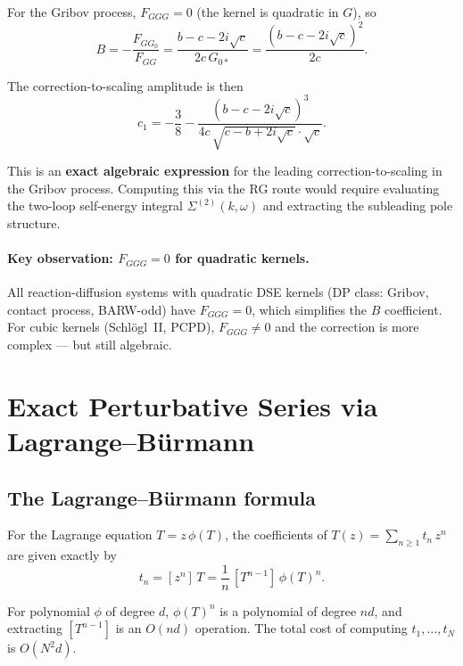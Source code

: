 \documentclass[11pt,a4paper]{article}
\theoremstyle{definition}
\begin{document}
For the Gribov process, $F_{GGG} = 0$ (the kernel is quadratic in $G$),
so
\begin{equation}
B = -\frac{F_{GG_0}}{F_{GG}} = \frac{b - c - 2i\sqrt{c}}{2c\,G_{0*}}
= \frac{(b - c - 2i\sqrt{c})^2}{2c}.
\end{equation}

The correction-to-scaling amplitude is then
\begin{equation}
\boxed{c_1 = -\frac{3}{8} - \frac{(b - c - 2i\sqrt{c})^3}{4c\,\sqrt{c - b + 2i\sqrt{c}} \cdot \sqrt{c}}}.
\label{eq:c1_gribov}
\end{equation}

This is an \textbf{exact algebraic expression} for the leading
correction-to-scaling in the Gribov process. Computing this via the
RG route would require evaluating the two-loop self-energy integral
$\Sigma^{(2)}(k, \omega)$ and extracting the subleading pole structure.

\paragraph{Key observation: $F_{GGG} = 0$ for quadratic kernels.}
All reaction-diffusion systems with quadratic DSE kernels (DP class:
Gribov, contact process, BARW-odd) have $F_{GGG} = 0$, which
simplifies the $B$ coefficient. For cubic kernels (Schl\"ogl~II, PCPD),
$F_{GGG} \neq 0$ and the correction is more complex --- but still
algebraic.


\section{Exact Perturbative Series via Lagrange--B\"urmann}
\label{sec:exact_series}

\subsection{The Lagrange--B\"urmann formula}

For the Lagrange equation $T = z\,\phi(T)$, the coefficients of
$T(z) = \sum_{n \geq 1} t_n\,z^n$ are given exactly by
\begin{equation}
t_n = [z^n]\,T = \frac{1}{n}\,[T^{n-1}]\,\phi(T)^n.
\label{eq:lagrange_burmann}
\end{equation}

For polynomial $\phi$ of degree $d$, $\phi(T)^n$ is a polynomial of
degree $nd$, and extracting $[T^{n-1}]$ is an $O(nd)$ operation.
The total cost of computing $t_1, \ldots, t_N$ is $O(N^2 d)$.
\end{document}
